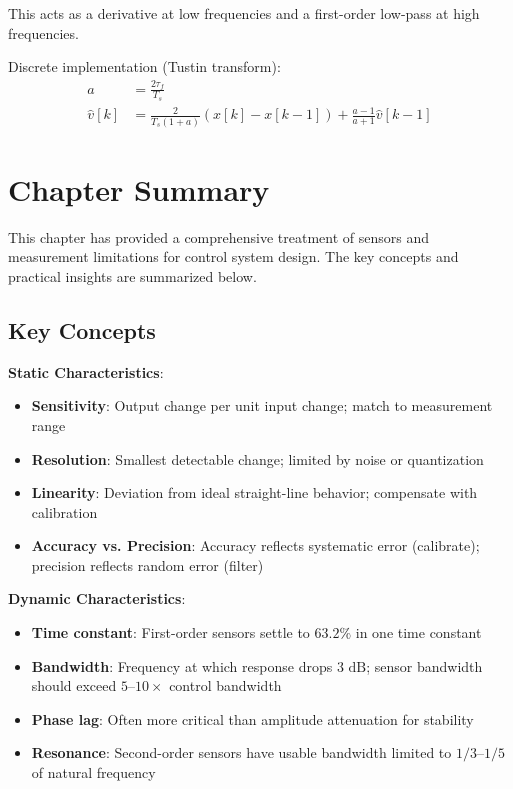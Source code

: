 This acts as a derivative at low frequencies and a first-order low-pass at high frequencies.

Discrete implementation (Tustin transform):
\begin{align}
a &= \frac{2\tau_f}{T_s} \\
\hat{v}[k] &= \frac{2}{T_s(1 + a)}(x[k] - x[k-1]) + \frac{a-1}{a+1}\hat{v}[k-1]
\end{align}

\section{Chapter Summary}
\label{sec:chapter_summary}

This chapter has provided a comprehensive treatment of sensors and measurement limitations for control system design. The key concepts and practical insights are summarized below.

\subsection{Key Concepts}

\textbf{Static Characteristics}:
\begin{itemize}
    \item \textbf{Sensitivity}: Output change per unit input change; match to measurement range
    \item \textbf{Resolution}: Smallest detectable change; limited by noise or quantization
    \item \textbf{Linearity}: Deviation from ideal straight-line behavior; compensate with calibration
    \item \textbf{Accuracy vs. Precision}: Accuracy reflects systematic error (calibrate); precision reflects random error (filter)
\end{itemize}

\textbf{Dynamic Characteristics}:
\begin{itemize}
    \item \textbf{Time constant}: First-order sensors settle to $63.2\%$ in one time constant
    \item \textbf{Bandwidth}: Frequency at which response drops $3\text{ dB}$; sensor bandwidth should exceed $5$--$10\times$ control bandwidth
    \item \textbf{Phase lag}: Often more critical than amplitude attenuation for stability
    \item \textbf{Resonance}: Second-order sensors have usable bandwidth limited to $1/3$--$1/5$ of natural frequency
\end{itemize}

